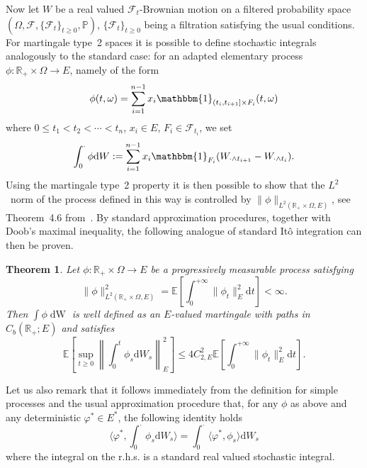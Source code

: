 \documentclass[10pt]{article}
\newcommand{\mathd}{\mathrm{d}}
\newcommand{\tmop}[1]{\ensuremath{\operatorname{#1}}}
\newtheorem{theorem}{Theorem}
\begin{document}
Now let $W$ be a real valued $\mathcal{F}_t$\mbox{-}Brownian motion on a
filtered probability space $(\Omega, \mathcal{F}, \{ \mathcal{F}_t \}_{t
\geqslant 0}, \mathbb{P})$, $\{ \mathcal{F}_t \}_{t \geqslant 0}$ being a
filtration satisfying the usual conditions. For martingale type~2 spaces it is
possible to define stochastic integrals analogously to the standard case: for
an adapted elementary process $\phi : \mathbb{R}_+ \times \Omega \rightarrow
E$, namely of the form
\[ \phi (t, \omega) = \sum_{i = 1}^{n - 1} x_i  \mathbbm{1}_{(t_i, t_{i + 1}]
   \times F_i} (t, \omega) \]
where $0 \leqslant t_1 < t_2 < \cdots < t_n$, $x_i \in E$, $F_i \in
\mathcal{F}_{t_i}$, we set
\[ \int_0^{\cdot} \phi \mathd W : = \sum_{i = 1}^{n - 1} x_i 
   \mathbbm{1}_{F_i} (W_{\cdot \wedge t_{i + 1}} - W_{\cdot \wedge t_i}) . \]
Using the martingale type~2 property it is then possible to show that the
$L^2$~norm of the process defined in this way is controlled by $\| \phi
\|_{L^2 (\mathbb{R}_+ \times \Omega, E)}$, see Theorem~4.6
from~{\cite{vanneerven2015}}. By standard approximation procedures, together
with Doob's maximal inequality, the following analogue of standard It{\^o}
integration can then be proven.

\begin{theorem}
  \label{apendixA3 thm stoch integral}Let $\phi : \mathbb{R}_+ \times \Omega
  \rightarrow E$ be a progressively measurable process satisfying
  \[ \| \phi \|_{L^2 (\mathbb{R}_+ \times \Omega, E)}^2 =\mathbb{E} \left[
     \int_0^{+ \infty} \| \phi_t \|_E^2 \mathd t \right] < \infty . \]
  Then $\int \phi \tmop{dW}$ is well defined as an $E$\mbox{-}valued
  martingale with paths in $C_b (\mathbb{R}_+ ; E)$ and satisfies
  \begin{equation}
    \mathbb{E} \left[ \sup_{t \geqslant 0} \left\| \int_0^t \phi_s \mathd W_s
    \right\|_E^2 \right] \leqslant 4 C_{2, E}^2 \mathbb{E} \left[ \int_0^{+
    \infty} \| \phi_t \|_E^2 \mathd t \right] . \label{appendixA3 ito}
  \end{equation}
\end{theorem}

Let us also remark that it follows immediately from the definition for simple
processes and the usual approximation procedure that, for any $\phi$ as above
and any deterministic $\varphi^{\ast} \in E^{\ast}$, the following identity
holds
\begin{equation}
  \langle \varphi^{\ast}, \int_0^{\cdot} \phi_s \mathd W_s \rangle =
  \int_0^{\cdot} \langle \varphi^{\ast}, \phi_s \rangle \mathd W_s
  \label{appendixA3 identity dual}
\end{equation}
where the integral on the r.h.s. is a standard real valued stochastic
integral.
\end{document}
